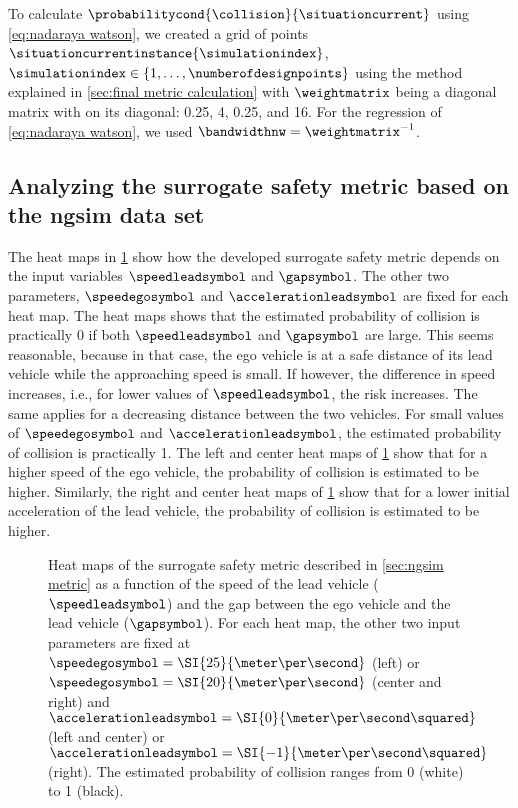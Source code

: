 To calculate $\probabilitycond{\collision}{\situationcurrent}$ using \cref{eq:nadaraya watson}, we created a grid of points $\situationcurrentinstance{\simulationindex}$, $\simulationindex\in\{1,\ldots,\numberofdesignpoints\}$ using the method explained in \cref{sec:final metric calculation} with $\weightmatrix$ being a diagonal matrix with on its diagonal: 0.25, 4, 0.25, and 16.
For the regression of \cref{eq:nadaraya watson}, we used $\bandwidthnw=\weightmatrix^{-1}$.



\subsection{Analyzing the surrogate safety metric based on the \acs{ngsim} data set}
\label{sec:analyzing ngsim metric}

The heat maps in \cref{fig:heatmaps} show how the developed surrogate safety metric depends on the input variables $\speedleadsymbol$ and $\gapsymbol$. 
The other two parameters, $\speedegosymbol$ and $\accelerationleadsymbol$ are fixed for each heat map.
The heat maps shows that the estimated probability of collision is practically 0 if both $\speedleadsymbol$ and $\gapsymbol$ are large.
This seems reasonable, because in that case, the ego vehicle is at a safe distance of its lead vehicle while the approaching speed is small. 
If however, the difference in speed increases, i.e., for lower values of $\speedleadsymbol$, the risk increases. 
The same applies for a decreasing distance between the two vehicles.
For small values of $\speedegosymbol$ and $\accelerationleadsymbol$, the estimated probability of collision is practically 1.
The left and center heat maps of \cref{fig:heatmaps} show that for a higher speed of the ego vehicle, the probability of collision is estimated to be higher.
Similarly, the right and center heat maps of \cref{fig:heatmaps} show that for a lower initial acceleration of the lead vehicle, the probability of collision is estimated to be higher.

\setlength{\figurewidth}{.35\linewidth}
\setlength{\figureheight}{0.8\figurewidth}
\begin{figure}
	\centering
	
	\caption{Heat maps of the surrogate safety metric described in \cref{sec:ngsim metric} as a function of the speed of the lead vehicle ($\speedleadsymbol$) and the gap between the ego vehicle and the lead vehicle ($\gapsymbol$).
		For each heat map, the other two input parameters are fixed at $\speedegosymbol=\SI{25}{\meter\per\second}$ (left) or $\speedegosymbol=\SI{20}{\meter\per\second}$ (center and right) and $\accelerationleadsymbol=\SI{0}{\meter\per\second\squared}$ (left and center) or $\accelerationleadsymbol=\SI{-1}{\meter\per\second\squared}$ (right).
		The estimated probability of collision ranges from 0 (white) to 1 (black).}
	\label{fig:heatmaps}
\end{figure}

